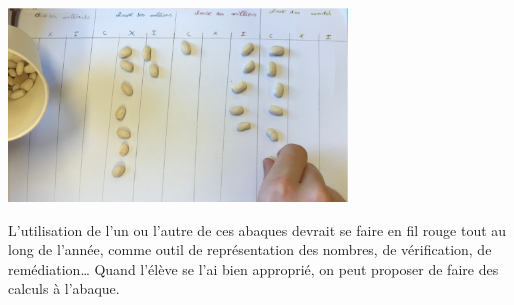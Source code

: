 \begin{exercice*}
\begin{enumerate}
   \begin{center}
      \includegraphics[width=9cm]{Nombres_et_calculs_did/Images/Num1_activites_abaque_romain}
   \end{center}    
   L'utilisation de l'un ou l'autre de ces abaques devrait se faire en fil rouge tout au long de l'année, comme outil de représentation des nombres, de vérification, de remédiation\dots{} Quand l'élève se l'ai bien approprié, on peut proposer de faire des calculs à l'abaque.
\end{enumerate}
\end{exercice*}   

